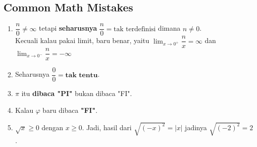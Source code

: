 \documentclass[11pt]{scrartcl}
\begin{document}
	\subsection{Common Math Mistakes}
	\begin{enumerate}
	    \item $\dfrac{n}{0} \neq \infty$ tetapi \textbf{seharusnya} $\dfrac{n}{0} = \text{tak terdefinisi}$ dimana $n \neq 0$.\\
	    Kecuali kalau pakai limit, baru benar, yaitu $\lim_{x \rightarrow 0^+} \dfrac{n}{x} = \infty$ dan $\lim_{x \rightarrow 0^-} \dfrac{n}{x} = -\infty$
	    \item Seharusnya $\dfrac{0}{0} = \textbf{tak tentu}$.
	    \item $\pi$ itu \textbf{dibaca "PI"} bukan dibaca "FI". 
	    \item Kalau $\varphi$ baru dibaca \textbf{"FI"}.
	    \item $\sqrt{x} \ge 0$ dengan $x \ge 0$. Jadi, hasil dari $\sqrt{(-x)^2}=|x|$ jadinya $\sqrt{(-2)^2}=2$.
	\end{enumerate}
\end{document}
